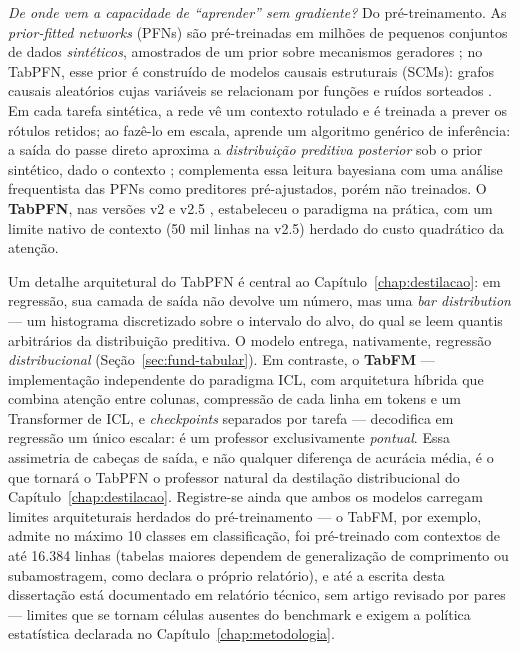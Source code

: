 \emph{De onde vem a capacidade de ``aprender'' sem gradiente?} Do
pré-treinamento. As \emph{prior-fitted networks} (PFNs) são pré-treinadas
em milhões de pequenos conjuntos de dados \emph{sintéticos}, amostrados de
um prior sobre mecanismos geradores \citep{muller2022pfn}; no TabPFN,
esse prior é construído de modelos causais
estruturais (SCMs): grafos causais aleatórios cujas variáveis se relacionam
por funções e ruídos sorteados \citep{hollmann2025}. Em cada tarefa
sintética, a rede vê um contexto rotulado e é treinada a prever os rótulos
retidos; ao fazê-lo em escala, aprende um algoritmo genérico de inferência:
a saída do passe direto aproxima a \emph{distribuição preditiva posterior}
sob o prior sintético, dado o contexto \citep{muller2022pfn};
\citet{nagler2023} complementa essa leitura bayesiana com uma análise
frequentista das PFNs como preditores pré-ajustados, porém não
treinados. O \textbf{TabPFN}, nas versões v2 \citep{hollmann2025}
e v2.5 \citep{priorlabs2025}, estabeleceu o paradigma na
prática, com um limite nativo de contexto (50 mil linhas na v2.5) herdado
do custo quadrático da atenção.

Um detalhe
arquitetural do TabPFN é central ao Capítulo~\ref{chap:destilacao}: em regressão, sua camada de
saída não devolve um número, mas uma \emph{bar distribution} --- um
histograma discretizado sobre o intervalo do alvo, do qual se leem quantis
arbitrários da distribuição preditiva. O modelo entrega, nativamente,
regressão \emph{distribucional} (Seção~\ref{sec:fund-tabular}). Em
contraste, o \textbf{TabFM} \citep{tabfm2026,kong2026} --- implementação
independente do paradigma ICL, com arquitetura híbrida que combina atenção
entre colunas, compressão de cada linha em tokens e um Transformer de ICL,
e \emph{checkpoints} separados por tarefa --- decodifica em regressão um
único escalar: é um professor exclusivamente \emph{pontual}. Essa
assimetria de cabeças de saída, e não qualquer diferença de acurácia média,
é o que tornará o TabPFN o professor natural da destilação distribucional
do Capítulo~\ref{chap:destilacao}. Registre-se ainda que ambos os modelos carregam limites
arquiteturais herdados do pré-treinamento --- o TabFM, por exemplo, admite
no máximo 10 classes em classificação, foi pré-treinado com contextos de
até 16.384 linhas (tabelas maiores dependem de generalização de
comprimento ou subamostragem, como declara o próprio relatório), e até a
escrita desta dissertação
está documentado em relatório técnico, sem artigo revisado por pares
\citep{tabfm2026,kong2026} --- limites que se tornam células ausentes do
benchmark e exigem a política estatística declarada no Capítulo~\ref{chap:metodologia}.


